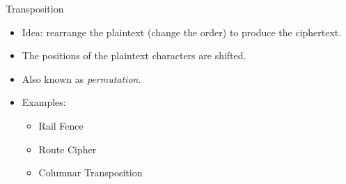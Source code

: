 \documentclass[presentation]{beamer}
\begin{document}
\begin{frame}[label=sec-15]{Transposition}
\begin{itemize}
\item Idea: rearrange the plaintext (change the order) to produce the ciphertext.
\item The positions of the plaintext characters are shifted.
\item Also known as \emph{permutation}.
\item Examples:
\begin{itemize}
\item Rail Fence
\item Route Cipher
\item Columnar Transposition
\end{itemize}
\end{itemize}
\end{frame}
\end{document}
